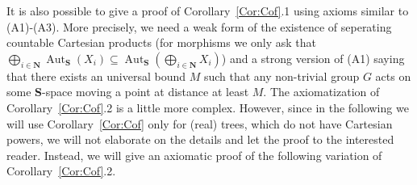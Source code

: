 \documentclass[a4paper]{article}
\newtheorem{lem}{Lemma}[section]
\theoremstyle{definition}
\DeclareMathOperator\Aut{Aut}
\newcommand*{\field}[1]{\mathbf{#1}}
\newcommand*{\category}[1]{\textbf{#1}}
\newcommand*{\CatS}{\category{S}}
\newcommand*{\N}{\field{N}}
\newcommand*{\BS}{B\textbf{S}}
\newcommand*{\FW}{FW}
\newcommand*{\powerset}[1]{\mathcal P(#1)}
\begin{document}
It is also possible to give a proof of Corollary~\ref{Cor:Cof}.1 using axioms similar to (A1)-(A3).
More precisely, we need a weak form of the existence of seperating countable Cartesian products (for morphisms we only ask that $\bigoplus_{i\in\N} \Aut_\CatS(X_i)\subseteq\Aut_\CatS(\bigoplus_{i\in\N} X_i)$) and a strong version of (A1) saying that there exists an universal bound $M$ such that any non-trivial group $G$ acts on some \CatS-space moving a point at distance at least $M$.
The axiomatization of Corollary~\ref{Cor:Cof}.2 is a little more complex.
However, since in the following we will use Corollary~\ref{Cor:Cof} only for (real) trees, which do not have Cartesian powers, we will not elaborate on the details and let the proof to the interested reader.
Instead, we will give an axiomatic proof of the following variation of Corollary~\ref{Cor:Cof}.2.
%
%
%
\end{document}
